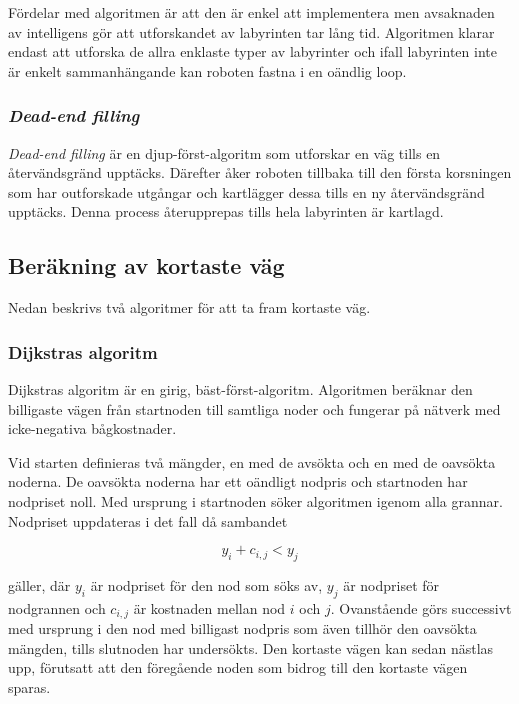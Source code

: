 \documentclass[11pt]{article}
\begin{document}
\begin{flushleft}
Fördelar med algoritmen är att den är enkel att implementera men avsaknaden av intelligens gör att utforskandet av labyrinten tar lång tid. Algoritmen klarar endast att utforska de allra enklaste typer av labyrinter och ifall labyrinten inte är enkelt sammanhängande kan roboten fastna i en oändlig loop.

\subsubsection{\emph{Dead-end filling}}
\emph{Dead-end filling} är en djup-först-algoritm som utforskar en väg tills en återvändsgränd upptäcks. Därefter åker roboten tillbaka till den första korsningen som har outforskade utgångar och kartlägger dessa tills en ny återvändsgränd upptäcks. Denna process återupprepas tills hela labyrinten är kartlagd.

\subsection{Beräkning av kortaste väg}
Nedan beskrivs två algoritmer för att ta fram kortaste väg.

\subsubsection{Dijkstras algoritm}
Dijkstras algoritm är en girig, bäst-först-algoritm. Algoritmen beräknar den billigaste vägen från startnoden till samtliga noder och fungerar på nätverk med icke-negativa bågkostnader. 

Vid starten definieras två mängder, en med de avsökta och en med de oavsökta noderna. De oavsökta noderna har ett oändligt nodpris och startnoden har nodpriset noll. Med ursprung i startnoden söker algoritmen igenom alla grannar. Nodpriset uppdateras i det fall då sambandet

\begin{displaymath}
	y_i + c_{i,j} < y_j
\end{displaymath}

gäller, där \begin{math} y_i \end{math} är nodpriset för den nod som söks av, \begin{math} y_j \end{math} är nodpriset för nodgrannen och \begin{math} c_{i,j} \end{math} är kostnaden mellan nod \begin{math} i \end{math} och \begin{math} j \end{math}. Ovanstående görs successivt med ursprung i den nod med billigast nodpris som även tillhör den oavsökta mängden, tills slutnoden har undersökts. Den kortaste vägen kan sedan nästlas upp, förutsatt att den föregående noden som bidrog till den kortaste vägen sparas. 


\end{flushleft}
\end{document}
